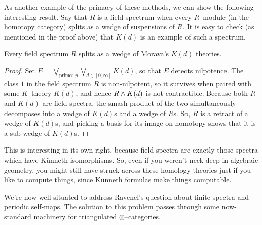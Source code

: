 As another example of the primacy of these methods, we can show the following interesting result.  Say that $R$ is a field spectrum when every $R$--module (in the homotopy category) splits as a wedge of suspensions of $R$.  It is easy to check (as mentioned in the proof above) that $K(d)$ is an example of such a spectrum.

\begin{corollary}\label{FieldSpectraAreKTheories}
Every field spectrum $R$ splits as a wedge of Morava's $K(d)$ theories.
\end{corollary}
\begin{proof}
Set $E = \bigvee_{\text{primes $p$}} \bigvee_{d \in [0, \infty]} K(d)$, so that $E$ detects nilpotence.  The class $1$ in the field spectrum $R$ is non-nilpotent, so it survives when paired with some $K$--theory $K(d)$, and hence $R \wedge K(d)$ is not contractible.  Because both $R$ and $K(d)$ are field spectra, the smash product of the two simultaneously decomposes into a wedge of $K(d)$s and a wedge of $R$s.  So, $R$ is a retract of a wedge of $K(d)$s, and picking a basis for its image on homotopy shows that it is a sub-wedge of $K(d)$s.
\end{proof}

\begin{remark}
This is interesting in its own right, because field spectra are exactly those spectra which have K\"unneth isomorphisms.  So, even if you weren't neck-deep in algebraic geometry, you might still have struck across these homology theories just if you like to compute things, since K\"unneth formulas make things computable.
\end{remark}





We're now well-situated to address Ravenel's question about finite spectra and periodic self-maps.  The solution to this problem passes through some now-standard machinery for triangulated $\otimes$--categories. 

